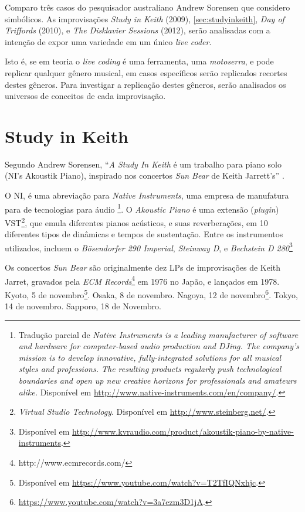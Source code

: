 \documentclass[
	12pt,				%
	openright,			%
	twoside,			%
	a4paper,			%
	english,			%
	french,				%
	spanish,			%
        italian,                        %
	brazil				%
	]{abntex2}
\begin{document}
Comparo três casos do pesquisador australiano Andrew Sorensen que considero simbólicos. As improvisações \emph{Study in Keith} (2009), \autoref{sec:studyinkeith}, \emph{Day of Triffords} (2010), e \emph{The Disklavier Sessions} (2012), serão analisadas com a intenção de expor uma variedade em um único \emph{live coder}. 

Isto é, se em teoria o \emph{live coding} é uma ferramenta, uma \emph{motoserra}, e pode replicar qualquer gênero musical, em casos específicos serão replicados recortes destes gêneros. Para investigar a replicação destes gêneros, serão analisados os universos de conceitos de cada improvisação.

\section{Study in Keith}\label{sec:studyinkeith}

Segundo Andrew Sorensen, ``\emph{A Study In Keith} é um trabalho para piano solo (NI's Akoustik Piano), inspirado nos concertos \emph{Sun Bear} de Keith Jarrett's'' \cite{sorensen_keith_2009}.

O NI, é uma abreviação para \emph{Native Instruments}, uma empresa de manufatura para  de tecnologias para áudio \footnote{Tradução parcial  de \emph{Native Instruments is a leading manufacturer of software and hardware for computer-based audio production and DJing. The company's mission is to develop innovative, fully-integrated solutions for all musical styles and professions. The resulting products regularly push technological boundaries and open up new creative horizons for professionals and amateurs alike.} Disponível em \url{http://www.native-instruments.com/en/company/}.}. O \emph{Akoustic Piano} é uma extensão (\emph{plugin}) VST\footnote{\emph{Virtual Studio Technology}. Disponível em \url{http://www.steinberg.net/}.}, que emula diferentes pianos acústicos, e suas reverberações, em 10 diferentes tipos de dinâmicas e tempos de sustentação. Entre os instrumentos utilizados, incluem o \emph{Bösendorfer 290 Imperial}, \emph{Steinway D}, e \emph{Bechstein D 280}\footnote{Disponível em \url{http://www.kvraudio.com/product/akoustik-piano-by-native-instruments}.}

Os concertos \emph{Sun Bear} são originalmente dez LPs  de improvisações de Keith Jarret, gravados pela \emph{ECM Records}\footnote{http://www.ecmrecords.com/} em 1976 no Japão, e lançados em 1978. Kyoto, 5 de novembro\footnote{Disponível em \url{https://www.youtube.com/watch?v=T2TfIQNxhjc}.}. Osaka, 8 de novembro. Nagoya, 12 de novembro\footnote{\url{https://www.youtube.com/watch?v=3a7ezm3D1jA}.}. Tokyo, 14 de novembro. Sapporo, 18 de Novembro.
\end{document}
